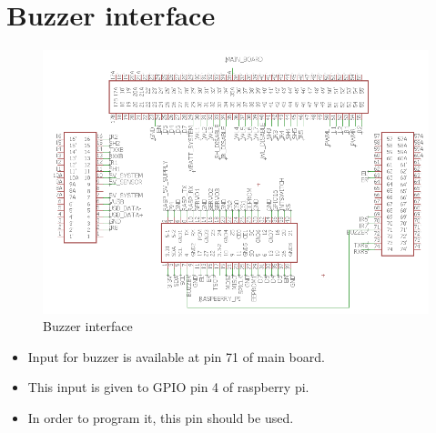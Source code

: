 \documentclass[a4paper,12pt,oneside]{book}
\begin{document}
\section{\textbf{Buzzer interface}}
\begin{figure}[h]
	\includegraphics[width=1\textwidth]{buzzer}
	\caption{Buzzer interface}
\end{figure}
\hfill
\begin{itemize}
	\item {Input for buzzer is available at pin 71 of main board.}
	\item {This input is given to GPIO pin 4 of raspberry pi.}
	\item {In order to program it, this pin should be used.}
\end{itemize}
\pagebreak
\end{document}
